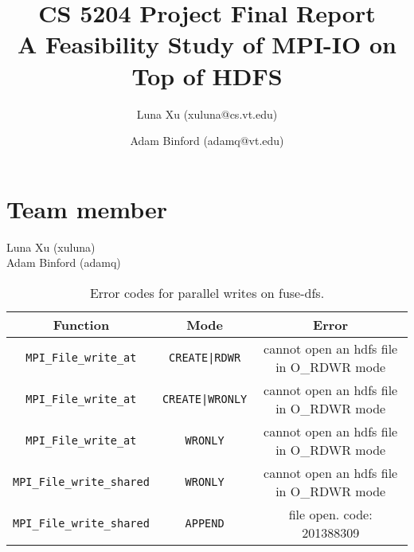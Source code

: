 \documentclass[11pt,titlepage]{article}
\author{Luna Xu (xuluna@cs.vt.edu) \and Adam Binford (adamq@vt.edu)}
\title{CS 5204 Project Final Report \\ A Feasibility Study of MPI-IO on Top of HDFS}
\newcommand{\otoprule}{\midrule[\heavyrulewidth]}
\begin{document}
\maketitle

\section{Team member}
Luna Xu (xuluna)\\
Adam Binford (adamq)







\begin{table}[t]
	\centering
	\small
	\begin{tabular}{ccc}
		\toprule
	{\bf Function} &{\bf Mode} &{\bf Error} \\\otoprule
		{\tt MPI\_File\_write\_at} & {\tt CREATE|RDWR} & cannot open an
		hdfs file in O\_RDWR mode \\
		{\tt MPI\_File\_write\_at} & {\tt CREATE|WRONLY} & cannot open an
		hdfs file in O\_RDWR mode \\
		{\tt MPI\_File\_write\_at} & {\tt WRONLY} & cannot open an
		hdfs file in O\_RDWR mode \\
		{\tt MPI\_File\_write\_shared} & {\tt WRONLY} & cannot open an
		hdfs file in O\_RDWR mode \\
		{\tt MPI\_File\_write\_shared} & {\tt APPEND} &file open. code:
		201388309\\\bottomrule 
	\end{tabular}
	\caption{\small Error codes for parallel writes on fuse-dfs.}
	\label{tab:write}
\end{table}
{}

\end{document}
